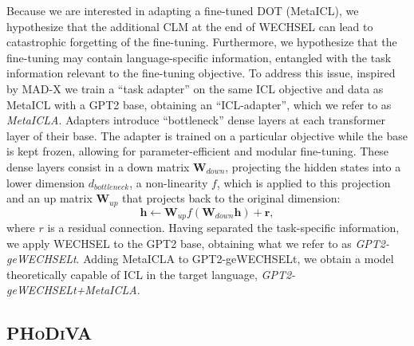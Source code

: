 \documentclass[11pt]{article}
\begin{document}
Because we are interested in adapting a fine-tuned DOT (MetaICL), we hypothesize that the additional
CLM at the end of WECHSEL can lead to catastrophic forgetting of the fine-tuning. Furthermore, we
hypothesize that the fine-tuning may contain language-specific information, entangled with the task
information relevant to the fine-tuning objective. To address this issue, inspired by MAD-X
\citep{pfeiffer_mad-x_2020} we train a ``task adapter'' on the same ICL objective and data as
MetaICL with a GPT2 base, obtaining an ``ICL-adapter'', which we refer to as \textit{MetaICLA}.
Adapters introduce ``bottleneck'' dense layers at each transformer layer of their base. The adapter
is trained on a particular objective while the base is kept frozen, allowing for parameter-efficient
and modular fine-tuning. These dense layers consist in a down matrix $\mathbf{W}_{down}$, projecting
the hidden states into a lower dimension $d_{bottleneck}$, a non-linearity $f$, which is applied to
this projection and an up matrix $\mathbf{W}_{up}$ that projects back to the original dimension:
\begin{equation} \mathbf{h} \leftarrow \mathbf{W}_{up} f(\mathbf{W}_{down} \mathbf{h}) + \mathbf{r},
\end{equation} where $r$ is a residual connection. Having separated the task-specific information,
we apply WECHSEL to the GPT2 base, obtaining what we refer to as \textit{GPT2-geWECHSELt}. Adding
MetaICLA to GPT2-geWECHSELt, we obtain a model theoretically capable of ICL in the target language,
\textit{GPT2-geWECHSELt+MetaICLA}.

\subsection{\textsc{PHoDiVA}}
\end{document}
